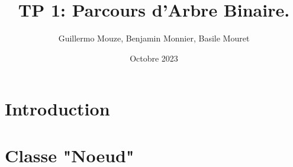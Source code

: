 \documentclass{article}
\title{TP 1: Parcours d'Arbre Binaire.}
\author{Guillermo Mouze, Benjamin Monnier, Basile Mouret}
\date{Octobre 2023}
\begin{document}
\maketitle
\tableofcontents{}

\section{Introduction}

\section{Classe "Noeud"}
\end{document}
